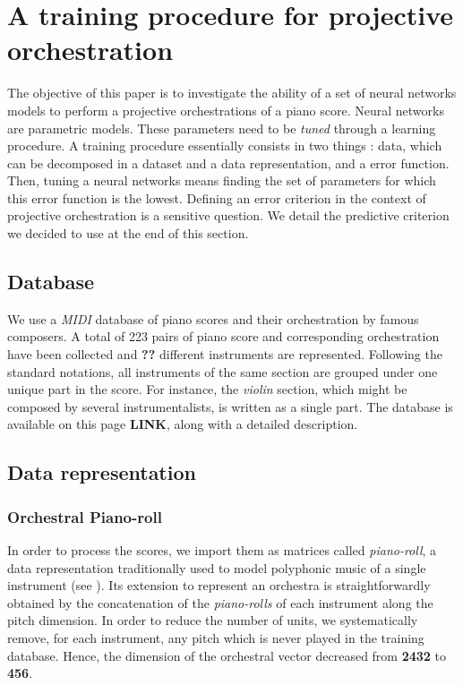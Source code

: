 \documentclass{article}
\begin{document}
\section{A training procedure for projective orchestration}
The objective of this paper is to investigate the ability of a set of neural networks models to perform a projective orchestrations of a piano score. 
Neural networks are parametric models. These parameters need to be \textit{tuned} through a learning procedure.
A training procedure essentially consists in two things : data, which can be decomposed in a dataset and a data representation, and a error function. Then, tuning a neural networks means finding the set of parameters for which this error function is the lowest. Defining an error criterion in the context of projective orchestration is a sensitive question. We detail the predictive criterion we decided to use at the end of this section.

\subsection{Database}
We use a \textit{MIDI} database of piano scores and their orchestration by famous composers. A total of 223 pairs of piano score and corresponding orchestration have been collected and \textbf{??} different instruments are represented. 
Following the standard notations, all instruments of the same section are grouped under one unique part in the score. For instance, the \textit{violin} section, which might be composed by several instrumentalists, is written as a single part.
The database is available on this page \textbf{LINK}, along with a detailed description.

\subsection{Data representation}
\subsubsection{Orchestral Piano-roll}
In order to process the scores, we import them as matrices called \textit{piano-roll}, a data representation traditionally used to model polyphonic music of a single instrument (see ). 
Its extension to represent an orchestra is straightforwardly obtained by the concatenation of the \textit{piano-rolls} of each instrument along the pitch dimension.
In order to reduce the number of units, we systematically remove, for each instrument, any pitch which is never played in the training database. Hence, the dimension of the orchestral vector decreased from \textbf{2432} to \textbf{456}.
\end{document}
